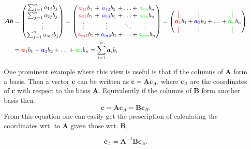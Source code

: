 \begin{align}
\bm{Ab} &= \begin{pmatrix}
    \sum_{j=1}^n a_{1j}b_j\\
    \sum_{j=1}^n a_{2j}b_j\\
    \vdots \\
    \sum_{j=1}^n a_{mj}b_j\\
\end{pmatrix} = 
{\setlength\arraycolsep{1pt}
\begin{pmatrix}
    \red{a_{11}} b_1 &+& \blue{a_{12}} b_2 &+&\hdots &+& \green{a_{1n}} b_n \\
    \red{a_{21}} b_1 &+& \blue{a_{22}} b_2 &+&\hdots &+& \green{a_{2n}} b_n \\
    \red{\vdots} \ \ & & \blue{\vdots} \ \ & &\ddots & & \green{\vdots} \ \ \\
    \red{a_{m1}} b_1 &+& \blue{a_{m2}} b_2 &+&\hdots &+& \green{a_{mn}} b_n \\
\end{pmatrix}} = 
{\setlength\arraycolsep{1pt}
\begin{pmatrix}
\red{\vertbar} \ \ & & \blue{\vertbar} \ \ & &        & & \green{\vertbar} \ \ \\
\red{\bm{a}_1} b_1 &+& \blue{\bm{a}_2} b_2 &+& \hdots &+& \green{\bm{a}_n} b_n \\
\red{\vertbar} \ \ & & \blue{\vertbar} \ \ & &        & & \green{\vertbar} \ \
\end{pmatrix}}  \\
&=\red{\bm{a}_1} b_1 +  \blue{\bm{a}_2} b_2 + \hdots + \green{\bm{a}_n} b_n = \sum_{i=1}^n \bm{a}_i b_i
\end{align}

One prominent example where this view is useful is that if the columns of $\bm{A}$ form a basis.
Then a vector $\bm{c}$ can be written as $\bm{c} = \bm{A}\bm{c}_A$, where 
$\bm{c}_A$ are the coordinates of $\bm{c}$ with respect to the basis $\bm{A}$.
Equivalently if the columns of $\bm{B}$ form another basis then
\begin{equation}
    \bm{c} = \bm{A}\bm{c}_A = \bm{B}\bm{c}_B.
\end{equation}
From this equation one can easily get the prescription of calculating
the coordinates wrt. to $\bm{A}$ given those wrt. $\bm{B}$,

\begin{equation}
    \bm{c}_A = \bm{A}^{-1} \bm{B}\bm{c}_B.
\end{equation}

